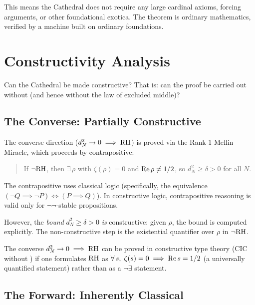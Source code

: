 \documentclass[11pt,a4paper]{article}
\begin{document}
This means the Cathedral does not require any large cardinal axioms,
forcing arguments, or other foundational exotica. The theorem is
ordinary mathematics, verified by a machine built on ordinary
foundations.

\section{Constructivity Analysis}
\label{sec:constructive}

Can the Cathedral be made constructive? That is: can the proof be
carried out without  (and hence without the
law of excluded middle)?

\subsection{The Converse: Partially Constructive}

The converse direction ($d_N^2 \to 0 \implies \mathrm{RH}$) is proved via
the Rank-1 Mellin Miracle, which proceeds by contrapositive:

\begin{quote}
If $\neg\mathrm{RH}$, then $\exists\,\rho$ with $\zeta(\rho) = 0$ and
$\operatorname{Re}\rho \neq 1/2$, so $d_N^2 \geq \delta > 0$ for all $N$.
\end{quote}

The contrapositive uses classical logic (specifically, the
equivalence $(\neg Q \implies \neg P) \iff (P \implies Q)$). In
constructive logic, contrapositive reasoning is valid only for
$\neg\neg$-stable propositions.

However, the \emph{bound} $d_N^2 \geq \delta > 0$ \emph{is}
constructive: given $\rho$, the bound is computed explicitly. The
non-constructive step is the existential quantifier over $\rho$ in
$\neg\mathrm{RH}$.

\begin{proposition}
The converse $d_N^2 \to 0 \implies \mathrm{RH}$ can be proved in
constructive type theory (CIC without ) if one
formulates $\mathrm{RH}$ as $\forall\,s,\;\zeta(s) = 0 \implies
\operatorname{Re} s = 1/2$ (a universally quantified statement) rather than
as a $\neg\exists$ statement.
\end{proposition}

\subsection{The Forward: Inherently Classical}
\end{document}
